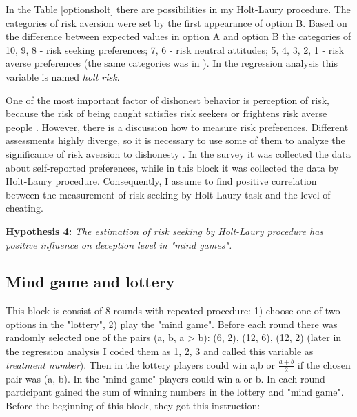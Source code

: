 \documentclass[12pt]{article}
\begin{document}
	In the Table \ref{optionsholt} there are possibilities in my Holt-Laury procedure. The categories of risk aversion were set by the first appearance of option B. Based on the difference between expected values in option A and option B the categories of 10, 9, 8 - risk seeking preferences; 7, 6 - risk neutral attitudes; 5, 4, 3, 2, 1 - risk averse preferences (the same categories was in \cite{gruener2018eliciting}). In the regression analysis this variable is named \textit{holt risk}.
	
	One of the most important factor of dishonest behavior is perception of risk, because the risk of being caught satisfies risk seekers or frightens risk averse people \autocite{arneklev1993low, becker1968crime}. However, there is a discussion how to measure risk preferences. Different assessments highly diverge, so it is necessary to use some of them to analyze the significance of risk aversion to dishonesty \autocite{gruener2018eliciting}. In the survey it was collected the data about self-reported preferences, while in this block it was collected the data by Holt-Laury procedure. Consequently, I assume to find positive correlation between the measurement of risk seeking by Holt-Laury task and the level of cheating.
	
	\vspace{0.1cm}
	
	\textbf{Hypothesis 4:}
	\textit{The estimation of risk seeking by Holt-Laury procedure has positive influence on deception level in "mind games".}
	
	\vspace{-0.4cm}
	
	\subsection{Mind game and lottery}
	\vspace{-0.1cm}
	
	This block is consist of 8 rounds with repeated procedure: 1) choose one of two options in the "lottery", 2) play the "mind game". Before each round there was randomly selected one of the pairs (a, b, a > b): (6, 2), (12, 6), (12, 2) (later in the regression analysis I coded them as 1, 2, 3 and called this variable as \textit{treatment number}). Then in the lottery players could win a,b or $\frac{a+b}{2}$ if the chosen pair was (a, b). In the "mind game" players could win a or b. In each round participant gained the sum of winning numbers in the lottery and "mind game". Before the beginning of this block, they got this instruction: 
	
\end{document}
